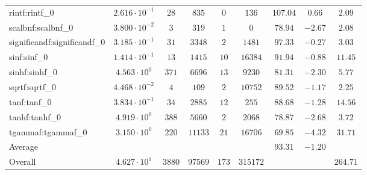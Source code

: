 \begin{tabular}{|l|c|c|c|c|c|c|c|c|}
rintf:rintf\_0               & $ 2.616 \cdot 10^{-1} $ & $ 28     $ & $ 835   $ & $ 0   $ & $ 136    $ & $ 107.04      $ & $ 0.66    $ & $ 2.09    $ \\
scalbnf:scalbnf\_0           & $ 3.800 \cdot 10^{-2} $ & $ 3      $ & $ 319   $ & $ 1   $ & $ 0      $ & $ 78.94       $ & $ -2.67   $ & $ 2.08    $ \\
significandf:significandf\_0 & $ 3.185 \cdot 10^{-1} $ & $ 31     $ & $ 3348  $ & $ 2   $ & $ 1481   $ & $ 97.33       $ & $ -0.27   $ & $ 3.03    $ \\
sinf:sinf\_0                 & $ 1.414 \cdot 10^{-1} $ & $ 13     $ & $ 1415  $ & $ 10  $ & $ 16384  $ & $ 91.94       $ & $ -0.88   $ & $ 11.45   $ \\
sinhf:sinhf\_0               & $ 4.563 \cdot 10^{0}  $ & $ 371    $ & $ 6696  $ & $ 13  $ & $ 9230   $ & $ 81.31       $ & $ -2.30   $ & $ 5.77    $ \\
sqrtf:sqrtf\_0               & $ 4.468 \cdot 10^{-2} $ & $ 4      $ & $ 109   $ & $ 2   $ & $ 10752  $ & $ 89.52       $ & $ -1.17   $ & $ 2.25    $ \\
tanf:tanf\_0                 & $ 3.834 \cdot 10^{-1} $ & $ 34     $ & $ 2885  $ & $ 12  $ & $ 255    $ & $ 88.68       $ & $ -1.28   $ & $ 14.56   $ \\
tanhf:tanhf\_0               & $ 4.919 \cdot 10^{0}  $ & $ 388    $ & $ 5660  $ & $ 2   $ & $ 2068   $ & $ 78.87       $ & $ -2.68   $ & $ 3.72    $ \\
tgammaf:tgammaf\_0           & $ 3.150 \cdot 10^{0}  $ & $ 220    $ & $ 11133 $ & $ 21  $ & $ 16706  $ & $ 69.85       $ & $ -4.32   $ & $ 31.71   $ \\
\hline
Average                      & $                     $ & $        $ & $       $ & $     $ & $        $ & $ 93.31       $ & $ -1.20   $ & $         $ \\
\hline
Overall                      & $ 4.627 \cdot 10^{1}  $ & $ 3880   $ & $ 97569 $ & $ 173 $ & $ 315172 $ & $             $ & $         $ & $ 264.71  $ \\
\hline
\end{tabular}
